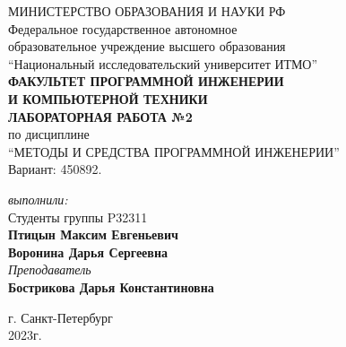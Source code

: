 \begin{center}
	МИНИСТЕРСТВО ОБРАЗОВАНИЯ И НАУКИ РФ\\
	\hfill \break
	Федеральное государственное автономное\\
	образовательное учреждение высшего образования\\
	``Национальный исследовательский университет ИТМО''\\
	\hfill \break
	\textbf{ФАКУЛЬТЕТ ПРОГРАММНОЙ ИНЖЕНЕРИИ \\
	И КОМПЬЮТЕРНОЙ ТЕХНИКИ}\\
	\vspace{2cm}
	\large{\textbf{ЛАБОРАТОРНАЯ РАБОТА №2}}\\
	\hfill \break
	по дисциплине\\
		\large{``МЕТОДЫ И СРЕДСТВА ПРОГРАММНОЙ ИНЖЕНЕРИИ''}\\
	\hfill \break
	Вариант: 450892. \\
	\vspace{5cm}
	\begin{flushright}
	\textit{выполнили:}\\
	Студенты группы P32311\\
	\textbf{Птицын Максим Евгеньевич}\\
	\textbf{Воронина Дарья Сергеевна}\\
	\textit{Преподаватель}\\
	\textbf{Бострикова Дарья Константиновна}
	\end{flushright}
\end{center}

\vfill

\begin{center}
	г. Санкт-Петербург\\2023г.
\end{center}
\thispagestyle{empty}
\newpage